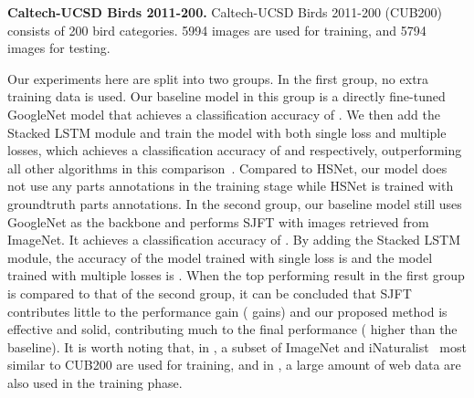 \documentclass[10pt,twocolumn,letterpaper]{article}
\begin{document}
\noindent\textbf{Caltech-UCSD Birds 2011-200.}
Caltech-UCSD Birds 2011-200 (CUB200) consists of 200 bird categories. 5994 images are used for training, and 5794 images for testing. 

Our experiments here are split into two groups. In the first group, no extra training data is used. Our baseline model in this group is a directly fine-tuned GoogleNet model that achieves a classification accuracy of . We then add the Stacked LSTM module and train the model with both single loss and multiple losses, which achieves a classification accuracy of  and  respectively, outperforming all other algorithms in this comparison~\cite{zheng17, Yu_2018_ECCV, wang16, Lam_17_HSNet}. Compared to HSNet, our model does not use any parts annotations in the training stage while HSNet is trained with groundtruth parts annotations. In the second group, our baseline model still uses GoogleNet as the backbone and performs SJFT with images retrieved from ImageNet. It achieves a classification accuracy of . By adding the Stacked LSTM module, the accuracy of the model trained with single loss is  and the model trained with multiple losses is . When the top performing result in the first group is compared to that of the second group, it can be concluded that SJFT contributes little to the performance gain ( gains) and our proposed method is effective and solid, contributing much to the final performance ( higher than the baseline). It is worth noting that, in \cite{cui18}, a subset of ImageNet and iNaturalist~\cite{van17} most similar to CUB200 are used for training, and in \cite{krause2015unreasonable}, a large amount of web data are also used in the training phase.
\end{document}
